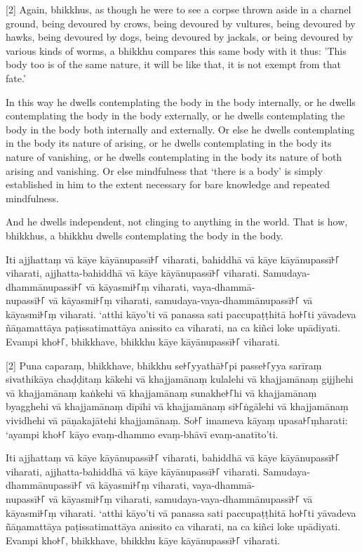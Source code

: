 [2] Again, bhikkhus, as though he were to see a corpse thrown aside in a charnel
ground, being devoured by crows, being devoured by vultures, being devoured by
hawks, being devoured by dogs, being devoured by jackals, or being devoured by
various kinds of worms, a bhikkhu compares this same body with it thus: 'This
body too is of the same nature, it will be like that, it is not exempt from that
fate.'

In this way he dwells contemplating the body in the body internally, or he
dwells contemplating the body in the body externally, or he dwells contemplating
the body in the body both internally and externally. Or else he dwells
contemplating in the body its nature of arising, or he dwells contemplating in
the body its nature of vanishing, or he dwells contemplating in the body its
nature of both arising and vanishing. Or else mindfulness that ‘there is a body’
is simply established in him to the extent necessary for bare knowledge and
repeated mindfulness.

And he dwells independent, not clinging to anything in the world. That is how,
bhikkhus, a bhikkhu dwells contemplating the body in the body.

\paliPage

Iti ajjhattaṃ vā kāye kāyānupassī꜔꜒ viharati, bahiddhā vā kāye kāyānupassī꜔꜒
viharati, ajjhatta-bahiddhā vā kāye kāyānupassī꜔꜒ viharati. Samudaya-dhammānupassī꜔꜒
vā kāyasmi꜔꜒ṃ viharati, vaya-dhammā-\\
nupassī꜔꜒ vā kāyasmi꜔꜒ṃ viharati, samudaya-vaya-dhammānupassī꜔꜒ vā kāyasmi꜔꜒ṃ viharati.
‘atthi kāyo’ti vā panassa sati paccupaṭṭhitā ho꜔꜒ti yāvadeva ñāṇamattāya
paṭissatimattāya anissito ca viharati, na ca kiñci loke upādiyati. Evampi kho꜔꜒,
bhikkhave, bhikkhu kāye kāyānupassī꜔꜒ viharati.

[2] Puna caparaṃ, bhikkhave, bhikkhu se꜔꜒yyathā꜔꜒pi passe꜔꜒yya sarīraṃ sivathikāya
chaḍḍitaṃ kākehi vā khajjamānaṃ kulalehi vā khajjamānaṃ gijjhehi vā khajjamānaṃ
kaṅkehi vā khajjamānaṃ sunakhe꜔꜒hi vā khajjamānaṃ byagghehi vā khajjamānaṃ dīpīhi
vā khajjamānaṃ si꜔꜒ṅgālehi vā khajjamānaṃ vividhehi vā pāṇakajātehi khajjamānaṃ.
So꜔꜒ imameva kāyaṃ upasa꜔꜒ṃharati: ‘ayampi kho꜔꜒ kāyo evaṃ-dhammo evaṃ-bhāvī
evaṃ-anatīto’ti.

Iti ajjhattaṃ vā kāye kāyānupassī꜔꜒ viharati, bahiddhā vā kāye kāyānupassī꜔꜒
viharati, ajjhatta-bahiddhā vā kāye kāyānupassī꜔꜒ viharati. Samudaya-dhammānupassī꜔꜒
vā kāyasmi꜔꜒ṃ viharati, vaya-dhammā-\\
nupassī꜔꜒ vā kāyasmi꜔꜒ṃ viharati, samudaya-vaya-dhammānupassī꜔꜒ vā kāyasmi꜔꜒ṃ viharati.
‘atthi kāyo’ti vā panassa sati paccupaṭṭhitā ho꜔꜒ti yāvadeva ñāṇamattāya
paṭissatimattāya anissito ca viharati, na ca kiñci loke upādiyati. Evampi kho꜔꜒,
bhikkhave, bhikkhu kāye kāyānupassī꜔꜒ viharati.

